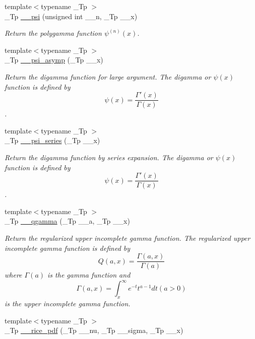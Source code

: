 \begin{DoxyCompactItemize}
{\footnotesize template$<$typename \+\_\+\+Tp $>$ }\\\+\_\+\+Tp \hyperlink{namespacestd_1_1____detail_a96d6b8301ca54615364a53665b347f6c}{\+\_\+\+\_\+psi} (unsigned int \+\_\+\+\_\+n, \+\_\+\+Tp \+\_\+\+\_\+x)
\begin{DoxyCompactList}\small\item\em Return the polygamma function $ \psi^{(n)}(x) $. \end{DoxyCompactList}\item 
{\footnotesize template$<$typename \+\_\+\+Tp $>$ }\\\+\_\+\+Tp \hyperlink{namespacestd_1_1____detail_a2557b5d815b6667bc9228c1e8a2a16ae}{\+\_\+\+\_\+psi\+\_\+asymp} (\+\_\+\+Tp \+\_\+\+\_\+x)
\begin{DoxyCompactList}\small\item\em Return the digamma function for large argument. The digamma or $ \psi(x) $ function is defined by \[ \psi(x) = \frac{\Gamma'(x)}{\Gamma(x)} \]. \end{DoxyCompactList}\item 
{\footnotesize template$<$typename \+\_\+\+Tp $>$ }\\\+\_\+\+Tp \hyperlink{namespacestd_1_1____detail_a378e78e1c3c08b8f146acf32a26e831a}{\+\_\+\+\_\+psi\+\_\+series} (\+\_\+\+Tp \+\_\+\+\_\+x)
\begin{DoxyCompactList}\small\item\em Return the digamma function by series expansion. The digamma or $ \psi(x) $ function is defined by \[ \psi(x) = \frac{\Gamma'(x)}{\Gamma(x)} \]. \end{DoxyCompactList}\item 
{\footnotesize template$<$typename \+\_\+\+Tp $>$ }\\\+\_\+\+Tp \hyperlink{namespacestd_1_1____detail_acaac94504608c15edb7d96884ac1dc23}{\+\_\+\+\_\+qgamma} (\+\_\+\+Tp \+\_\+\+\_\+a, \+\_\+\+Tp \+\_\+\+\_\+x)
\begin{DoxyCompactList}\small\item\em Return the regularized upper incomplete gamma function. The regularized upper incomplete gamma function is defined by \[ Q(a,x) = \frac{\Gamma(a,x)}{\Gamma(a)} \] where $ \Gamma(a) $ is the gamma function and \[ \Gamma(a,x) = \int_x^\infty e^{-t}t^{a-1}dt (a > 0) \] is the upper incomplete gamma function. \end{DoxyCompactList}\item 
{\footnotesize template$<$typename \+\_\+\+Tp $>$ }\\\+\_\+\+Tp \hyperlink{namespacestd_1_1____detail_a571f37fdf793a91985073a58a873e731}{\+\_\+\+\_\+rice\+\_\+pdf} (\+\_\+\+Tp \+\_\+\+\_\+nu, \+\_\+\+Tp \+\_\+\+\_\+sigma, \+\_\+\+Tp \+\_\+\+\_\+x)

\end{DoxyCompactItemize}
